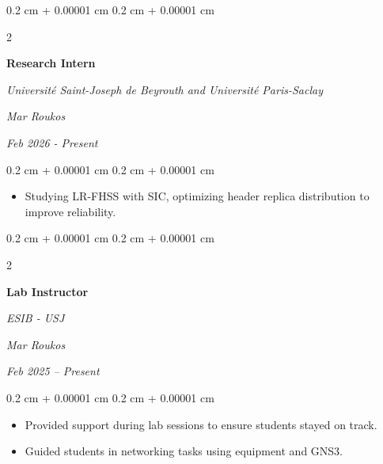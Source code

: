 \documentclass[10pt, letterpaper]{article}
\newenvironment{highlights}{
    \begin{itemize}[
        topsep=0.10 cm,
        parsep=0.10 cm,
        partopsep=0pt,
        itemsep=0pt,
        leftmargin=0.4 cm + 10pt
    ]
}{
    \end{itemize}
} %
\newenvironment{onecolentry}{
    \begin{adjustwidth}{
        0.2 cm + 0.00001 cm
    }{
        0.2 cm + 0.00001 cm
    }
}{
    \end{adjustwidth}
} %
\newenvironment{twocolentry}[2][]{
    \onecolentry
    \def\secondColumn{#2}
    \setcolumnwidth{\fill, 4.5 cm}
    \begin{paracol}{2}
}{
    \switchcolumn \raggedleft \secondColumn
    \end{paracol}
    \endonecolentry
} %
\begin{document}
    \vspace{0.2 cm}
         \begin{twocolentry}{
        \textit{Mar Roukos}    
            
        \textit{Feb 2026 - Present}}
            \textbf{Research Intern}
            
            
            \textit{Université Saint-Joseph de Beyrouth and Université Paris-Saclay}
        \end{twocolentry}
        \vspace{0.10 cm}
        \begin{onecolentry}
        
            \begin{highlights}
                \item Studying LR-FHSS with SIC, optimizing header replica distribution to improve reliability.


                
            \end{highlights}
        \end{onecolentry}
        
        \vspace{0.2 cm}
        \begin{twocolentry}{
        \textit{Mar Roukos}    
            
        \textit{Feb 2025 – Present}}
            \textbf{Lab Instructor}
            
            
            \textit{ESIB - USJ}
        \end{twocolentry}
        \vspace{0.10 cm}
        \begin{onecolentry}
        
            \begin{highlights}
                \item Provided support during lab sessions to ensure students stayed on track.
                \item Guided students in networking tasks using equipment and GNS3.
                
            \end{highlights}
        \end{onecolentry}
        


    
\end{document}

